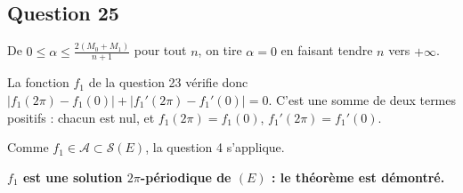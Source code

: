 \documentclass[11pt,a4paper]{article}
\begin{document}
\hypertarget{question-25}{%
\subsection{Question 25}\label{question-25}}

De \(0\le\alpha\le\frac{2(M_0+M_1)}{n+1}\) pour tout \(n\), on tire \(\alpha=0\) en faisant tendre \(n\) vers \(+\infty\).

La fonction \(f_1\) de la question 23 vérifie donc \(|f_1(2\pi)-f_1(0)|+|f_1'(2\pi)-f_1'(0)|=0\). C'est une somme de deux termes positifs : chacun est nul, et \(f_1(2\pi)=f_1(0)\), \(f_1'(2\pi)=f_1'(0)\).

Comme \(f_1\in\mathcal A\subset\mathcal S(E)\), la question 4 s'applique.

\textbf{\(f_1\) est une solution \(2\pi\)-périodique de \((E)\) : le théorème est démontré.}
\end{document}
